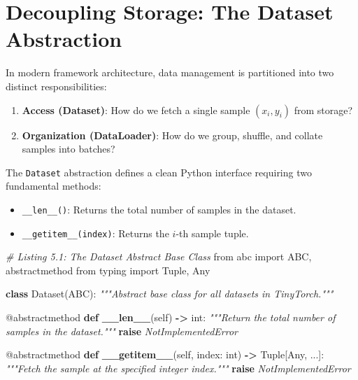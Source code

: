 \documentclass[
  letterpaper,
]{scrbook}
\newenvironment{Shaded}{\begin{snugshade}}{\end{snugshade}}
\newcommand{\AttributeTok}[1]{\textcolor[rgb]{0.13,0.29,0.53}{#1}}
\newcommand{\BuiltInTok}[1]{#1}
\newcommand{\CommentTok}[1]{\textcolor[rgb]{0.56,0.35,0.01}{\textit{#1}}}
\newcommand{\ControlFlowTok}[1]{\textcolor[rgb]{0.13,0.29,0.53}{\textbf{#1}}}
\newcommand{\FunctionTok}[1]{\textcolor[rgb]{0.13,0.29,0.53}{\textbf{#1}}}
\newcommand{\ImportTok}[1]{#1}
\newcommand{\KeywordTok}[1]{\textcolor[rgb]{0.13,0.29,0.53}{\textbf{#1}}}
\newcommand{\NormalTok}[1]{#1}
\newcommand{\OperatorTok}[1]{\textcolor[rgb]{0.81,0.36,0.00}{\textbf{#1}}}
\newcommand{\PreprocessorTok}[1]{\textcolor[rgb]{0.56,0.35,0.01}{\textit{#1}}}
\newcommand{\VariableTok}[1]{\textcolor[rgb]{0.00,0.00,0.00}{#1}}
\providecommand{\tightlist}{%
  \setlength{\itemsep}{0pt}\setlength{\parskip}{0pt}}
\begin{document}
\section{Decoupling Storage: The Dataset
Abstraction}\label{decoupling-storage-the-dataset-abstraction}

In modern framework architecture, data management is partitioned into
two distinct responsibilities:

\begin{enumerate}
\def\labelenumi{\arabic{enumi}.}
\tightlist
\item
  \textbf{Access (Dataset)}: How do we fetch a single sample
  \((x_i, y_i)\) from storage?
\item
  \textbf{Organization (DataLoader)}: How do we group, shuffle, and
  collate samples into batches?
\end{enumerate}

The \texttt{Dataset} abstraction defines a clean Python interface
requiring two fundamental methods:

\begin{itemize}
\tightlist
\item
  \texttt{\_\_len\_\_()}: Returns the total number of samples in the
  dataset.
\item
  \texttt{\_\_getitem\_\_(index)}: Returns the \(i\)-th sample tuple.
\end{itemize}

\begin{Shaded}
\begin{Highlighting}[]
\CommentTok{\# Listing 5.1: The Dataset Abstract Base Class}
\ImportTok{from}\NormalTok{ abc }\ImportTok{import}\NormalTok{ ABC, abstractmethod}
\ImportTok{from}\NormalTok{ typing }\ImportTok{import}\NormalTok{ Tuple, Any}

\KeywordTok{class}\NormalTok{ Dataset(ABC):}
    \CommentTok{"""Abstract base class for all datasets in TinyTorch."""}

    \AttributeTok{@abstractmethod}
    \KeywordTok{def} \FunctionTok{\_\_len\_\_}\NormalTok{(}\VariableTok{self}\NormalTok{) }\OperatorTok{{-}\textgreater{}} \BuiltInTok{int}\NormalTok{:}
        \CommentTok{"""Return the total number of samples in the dataset."""}
        \ControlFlowTok{raise} \PreprocessorTok{NotImplementedError}

    \AttributeTok{@abstractmethod}
    \KeywordTok{def} \FunctionTok{\_\_getitem\_\_}\NormalTok{(}\VariableTok{self}\NormalTok{, index: }\BuiltInTok{int}\NormalTok{) }\OperatorTok{{-}\textgreater{}}\NormalTok{ Tuple[Any, ...]:}
        \CommentTok{"""Fetch the sample at the specified integer index."""}
        \ControlFlowTok{raise} \PreprocessorTok{NotImplementedError}
\end{Highlighting}
\end{Shaded}
\end{document}
